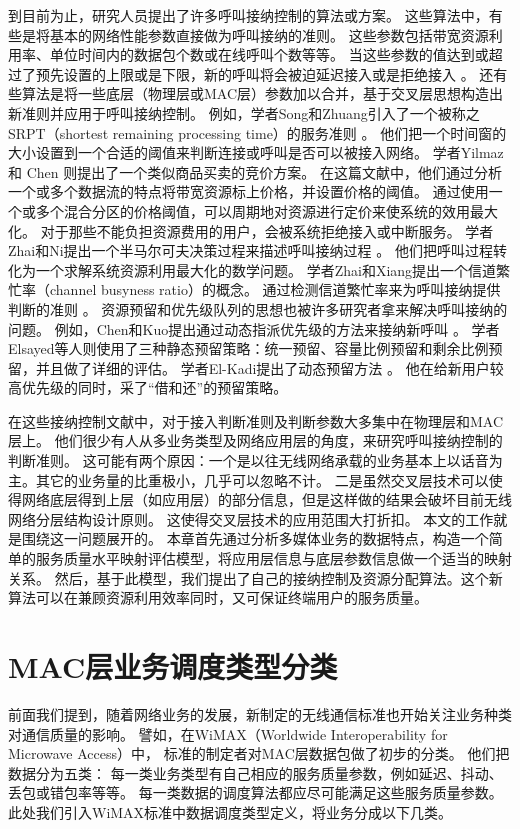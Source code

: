 到目前为止，研究人员提出了许多呼叫接纳控制的算法或方案。
这些算法中，有些是将基本的网络性能参数直接做为呼叫接纳的准则。
这些参数包括带宽资源利用率、单位时间内的数据包个数或在线呼叫个数等等。
当这些参数的值达到或超过了预先设置的上限或是下限，新的呼叫将会被迫延迟接入或是拒绝接入\cite{Y-Qian.TWC.2006} \cite{G-Djuka.TELSIK.2007}。
还有些算法是将一些底层（物理层或MAC层）参数加以合并，基于交叉层思想构造出新准则并应用于呼叫接纳控制。
例如，学者Song和Zhuang引入了一个被称之SRPT（shortest remaining processing time）的服务准则 \cite{Song2009}。
他们把一个时间窗的大小设置到一个合适的阈值来判断连接或呼叫是否可以被接入网络。
学者Yilmaz 和 Chen 则提出了一个类似商品买卖的竞价方案\cite{Yilmax2009}。
在这篇文献中，他们通过分析一个或多个数据流的特点将带宽资源标上价格，并设置价格的阈值。
通过使用一个或多个混合分区的价格阈值，可以周期地对资源进行定价来使系统的效用最大化。
对于那些不能负担资源费用的用户，会被系统拒绝接入或中断服务。
学者Zhai和Ni提出一个半马尔可夫决策过程来描述呼叫接纳过程 \cite{Zhai2005,Ni2009}。
他们把呼叫过程转化为一个求解系统资源利用最大化的数学问题。
学者Zhai和Xiang提出一个信道繁忙率（channel busyness ratio）的概念。
通过检测信道繁忙率来为呼叫接纳提供判断的准则 \cite{Zhai_Chen_Fang_2006}。
资源预留和优先级队列的思想也被许多研究者拿来解决呼叫接纳的问题。
例如，Chen和Kuo提出通过动态指派优先级的方法来接纳新呼叫 \cite{Chen_Kumar_Kuo_2003,Chen_Kuo_2004}。
学者Elsayed等人则使用了三种静态预留策略：统一预留、容量比例预留和剩余比例预留，并且做了详细的评估\cite{Elsayed02performanceevaluation}。
学者El-Kadi提出了动态预留方法 \cite{EL-Kadi2002}。
他在给新用户较高优先级的同时，采了“借和还”的预留策略。

在这些接纳控制文献中，对于接入判断准则及判断参数大多集中在物理层和MAC层上。
他们很少有人从多业务类型及网络应用层的角度，来研究呼叫接纳控制的判断准则。
这可能有两个原因：一个是以往无线网络承载的业务基本上以话音为主。其它的业务量的比重极小，几乎可以忽略不计。
二是虽然交叉层技术可以使得网络底层得到上层（如应用层）的部分信息，但是这样做的结果会破坏目前无线网络分层结构设计原则。
这使得交叉层技术的应用范围大打折扣。
本文的工作就是围绕这一问题展开的。
本章首先通过分析多媒体业务的数据特点，构造一个简单的服务质量水平映射评估模型，将应用层信息与底层参数信息做一个适当的映射关系。
然后，基于此模型，我们提出了自己的接纳控制及资源分配算法。这个新算法可以在兼顾资源利用效率同时，又可保证终端用户的服务质量。
%
\section{MAC层业务调度类型分类}
前面我们提到，随着网络业务的发展，新制定的无线通信标准也开始关注业务种类对通信质量的影响。
譬如，在WiMAX（Worldwide Interoperability for Microwave Access）中，
标准的制定者对MAC层数据包做了初步的分类\cite{Tsagkaris_Demestichas_2009}\cite{Andrews_Ghosh_Muhamed_2007}。
他们把数据分为五类：
每一类业务类型有自己相应的服务质量参数，例如延迟、抖动、丢包或错包率等等。
每一类数据的调度算法都应尽可能满足这些服务质量参数。
此处我们引入WiMAX标准中数据调度类型定义，将业务分成以下几类。

